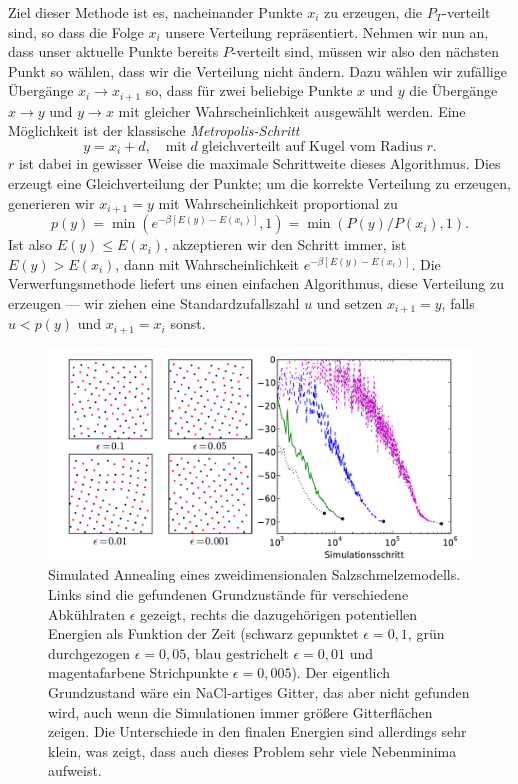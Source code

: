  Ziel dieser
Methode ist es, nacheinander Punkte $x_i$ zu erzeugen, die
$P_T$-verteilt sind, so dass die Folge $x_i$ unsere Verteilung
repräsentiert. Nehmen wir nun an, dass unser aktuelle Punkte bereits
$P$-verteilt sind, müssen wir also den nächsten Punkt so wählen, dass
wir die Verteilung nicht ändern. Dazu wählen wir zufällige Übergänge
$x_i\to x_{i+1}$ so, dass für zwei beliebige Punkte $x$ und $y$ die
Übergänge $x\to y$ und $y\to x$ mit gleicher Wahrscheinlichkeit
ausgewählt werden. Eine Möglichkeit ist der klassische
\emph{Metropolis-Schritt}
\begin{equation}
  y = x_i + d,\quad\text{mit}\; d\;\text{gleichverteilt auf
    Kugel vom Radius}\; r.
\end{equation}
$r$ ist dabei in gewisser Weise die maximale Schrittweite dieses
Algorithmus. Dies erzeugt eine Gleichverteilung der Punkte; um die
korrekte Verteilung zu erzeugen, generieren wir $x_{i+1}=y$ mit
Wahrscheinlichkeit proportional zu
\begin{equation}
  p(y) = \min(e^{-\beta [E(y) - E(x_i)]}, 1) = \min(P(y)/P(x_i), 1).
\end{equation}
Ist also $E(y) \le E(x_i)$, akzeptieren wir den Schritt immer, ist
$E(y) > E(x_i)$, dann mit Wahrscheinlichkeit $e^{-\beta [E(y) -
  E(x_i)]}$. Die Verwerfungsmethode liefert uns einen einfachen
Algorithmus, diese Verteilung zu erzeugen --- wir ziehen eine
Standardzufallszahl $u$ und setzen $x_{i+1}=y$, falls $u<p(y)$ und
$x_{i+1}=x_i$ sonst.

\begin{figure}
  \centering
  \includegraphics[width=\textwidth]{plots/simulated_annealing}
  \caption{Simulated Annealing eines zweidimensionalen
    Salzschmelzemodells. Links sind die gefundenen Grundzustände für
    verschiedene Abkühlraten $\epsilon$ gezeigt, rechts die
    dazugehörigen potentiellen Energien als Funktion der Zeit (schwarz
    gepunktet $\epsilon=0,1$, grün durchgezogen $\epsilon=0,05$, blau
    gestrichelt $\epsilon=0,01$ und magentafarbene Strichpunkte
    $\epsilon=0,005$). Der eigentlich Grundzustand wäre ein
    NaCl-artiges Gitter, das aber nicht gefunden wird, auch wenn die
    Simulationen immer größere Gitterflächen zeigen. Die Unterschiede
    in den finalen Energien sind allerdings sehr klein, was zeigt,
    dass auch dieses Problem sehr viele Nebenminima aufweist.}
  \label{fig:simanneal}
\end{figure}

